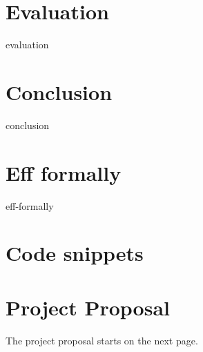 \documentclass[%
    oneside,
    bibliography=toc,
    listof=leveldown,%
    fontsize=11pt
]{scrbook}
\begin{document}
\chapter{Evaluation}
{evaluation}

\chapter{Conclusion}
{conclusion}

{}


\appendix

\begin{appendices}
\renewcommand{\thepage}{\thechapter.\arabic{page}}

\chapter{Eff formally}
\setcounter{page}{1}
{eff-formally}

\chapter{Code snippets}
\setcounter{page}{1}

\chapter{Project Proposal}
\setcounter{page}{1}
The project proposal starts on the next page.


\end{appendices}
\end{document}
